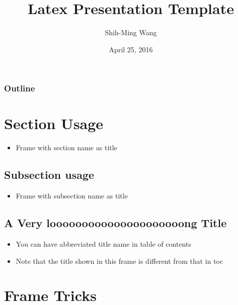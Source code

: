 \documentclass[compress]{beamer}
\title{Latex Presentation Template}
\author{Shih-Ming Wang}
\institute{NLPLab, Institute of Information Science, Academia Sinica}
\date{April 25, 2016}
\begin{document}
\beamertemplatenavigationsymbolsempty

\begin{frame}
    \maketitle
\end{frame}

\begin{frame}
    \frametitle{Outline}
    \tableofcontents
\end{frame}
\section{Section Usage}
    \begin{frame}{\secname}
        \begin{itemize}
            \item Frame with section name as title
        \end{itemize}
    \end{frame} 
    \subsection{Subsection usage}
        \begin{frame}{\subsecname}
            \begin{itemize}
                \item Frame with subsection name as title
            \end{itemize}
        \end{frame} 
    \subsection[Abbreviated Long Title]{A Very looooooooooooooooooooong Title}
        \begin{frame}{\subsecname}
            \begin{itemize}
                \item You can have abbreviated title name in table of contents
                \item Note that the title shown in this frame is different from that in toc
            \end{itemize}
        \end{frame} 
\section{Frame Tricks}
\end{document}
